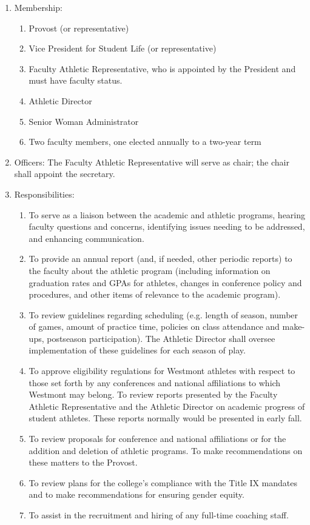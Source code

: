 \documentclass[letterpaper, 11pt]{article}
\begin{document}
					\begin{enumerate}[label=\alph*)]
						\item{Membership:
							\begin{enumerate}[label=\arabic*)]
								\item{Provost (or representative)}
								\item{Vice President for Student Life (or representative)}
								\item{Faculty Athletic Representative, who is appointed by the President and must have faculty status.}
								\item{Athletic Director}
								\item{Senior Woman Administrator}
								\item{Two faculty members, one elected annually to a two-year term}
							\end{enumerate}
						}
						\item{Officers:
							The Faculty Athletic Representative will serve as chair; the chair shall appoint the secretary.
						}
						\item{Responsibilities:
							\begin{enumerate}[label=\arabic*)]
								\item{To serve as a liaison between the academic and athletic programs, hearing faculty questions and concerns, identifying issues needing to be addressed, and enhancing communication.}
								\item{To provide an annual report (and, if needed, other periodic reports) to the faculty about the athletic program (including information on graduation rates and GPAs for athletes, changes in conference policy and procedures, and other items of relevance to the academic program).}
								\item{To review guidelines regarding scheduling (e.g. length of season, number of games, amount of practice time, policies on class attendance and make-ups, postseason participation).  The Athletic Director shall oversee implementation of these guidelines for each season of play.}
								\item{To approve eligibility regulations for Westmont athletes with respect to those set forth by any conferences and national affiliations to which Westmont may belong.  To review reports presented by the Faculty Athletic Representative and the Athletic Director on academic progress of student athletes.  These reports normally would be presented in early fall.}
								\item{To review proposals for conference and national affiliations or for the addition and deletion of athletic programs.  To make recommendations on these matters to the Provost.}
								\item{To review plans for the college's compliance with the Title IX mandates and to make recommendations for ensuring gender equity.}
								\item{To assist in the recruitment and hiring of any full-time coaching staff.}
							\end{enumerate}
						}
					\end{enumerate}
\end{document}
